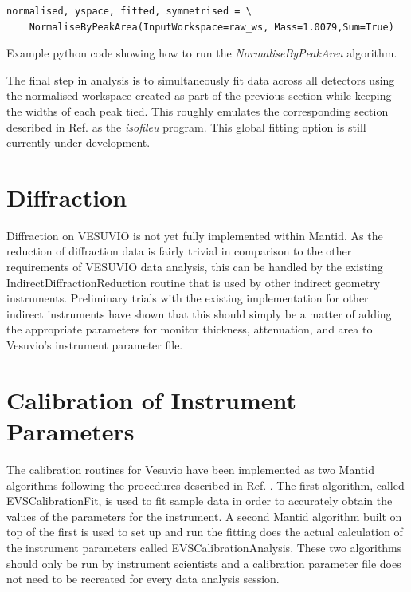 \documentclass[paper=a4, fontsize=11pt]{scrartcl}	%
\numberwithin{equation}{section}															%
\numberwithin{figure}{section}																%
\numberwithin{table}{section}
\begin{document}
\begin{listing}[H]
\begin{verbatim}
normalised, yspace, fitted, symmetrised = \
	NormaliseByPeakArea(InputWorkspace=raw_ws, Mass=1.0079,Sum=True)
\end{verbatim}
\caption{Example python code showing how to run the \textit{NormaliseByPeakArea} algorithm.}
\label{lst:plot-angle}
\end{listing}

The final step in analysis is to simultaneously fit data across all detectors using the normalised workspace created as part of the previous section while keeping the widths of each peak tied. This roughly emulates the corresponding section described in Ref. \cite{mayers2010user} as the \textit{isofileu} program. This global fitting option is still currently under development.


\section{Diffraction}
\label{sec:diffraction}
Diffraction on VESUVIO is not yet fully implemented within Mantid. As the reduction of diffraction data is fairly trivial in comparison to the other requirements of VESUVIO data analysis, this can be handled by the existing IndirectDiffractionReduction routine that is used by other indirect geometry instruments. Preliminary trials with the existing implementation for other indirect instruments have shown that this should simply be a matter of adding the appropriate parameters for monitor thickness, attenuation, and area to Vesuvio's instrument parameter file.

\section{Calibration of Instrument Parameters}
\label{sec:calibration}
The calibration routines for Vesuvio have been implemented as two Mantid algorithms following the procedures described in Ref. \cite{mayers2011calibration}. The first algorithm, called EVSCalibrationFit, is used to fit sample data in order to accurately obtain the values of the parameters for the instrument. A second Mantid algorithm built on top of the first is used to set up and run the fitting does the actual calculation of the instrument parameters called EVSCalibrationAnalysis. These two algorithms should only be run by instrument scientists and a calibration parameter file does not need to be recreated for every data analysis session.
\end{document}
